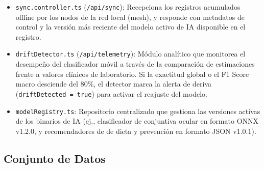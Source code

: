 \begin{enumerate}
    \begin{itemize}
        \item \texttt{sync.controller.ts} (\texttt{/api/sync}): Recepciona los registros acumulados offline por los nodos de la red local (mesh), y responde con metadatos de control y la versión más reciente del modelo activo de IA disponible en el registro.
        \item \texttt{driftDetector.ts} (\texttt{/api/telemetry}): Módulo analítico que monitorea el desempeño del clasificador móvil a través de la comparación de estimaciones frente a valores clínicos de laboratorio. Si la exactitud global o el F1 Score macro desciende del 80\%, el detector marca la alerta de deriva (\texttt{driftDetected = true}) para activar el reajuste del modelo.
        \item \texttt{modelRegistry.ts}: Repositorio centralizado que gestiona las versiones activas de los binarios de IA (ej., clasificador de conjuntiva ocular en formato ONNX v1.2.0, y recomendadores de de dieta y prevención en formato JSON v1.0.1).
    \end{itemize}
\end{enumerate}





\subsection{Conjunto de Datos}
\label{sec:dataset}

